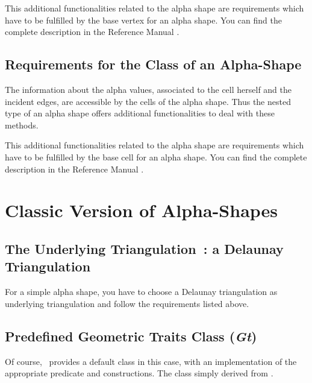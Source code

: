 This additional functionalities related to the alpha shape
are requirements which have to be fulfilled by the base vertex for an alpha
shape. You can find the complete description in the Reference Manual
.  

\subsection{Requirements for the \protect {} Class of an Alpha-Shape}

The information about the alpha values, associated to the cell herself and the
incident edges, are accessible by the 
cells of the alpha shape. Thus the nested 
type of an alpha shape offers additional functionalities to deal with these
methods.

This additional functionalities related to the alpha shape are requirements
which have to be fulfilled by the base cell  for an alpha shape. You can find
the complete description in the Reference Manual
.


\section{Classic Version of Alpha-Shapes\label{I1_SectClassicAS3D}}

\subsection*{The Underlying Triangulation~: a Delaunay Triangulation}

For a simple alpha shape, you have to choose a Delaunay triangulation as
underlying triangulation  and follow the requirements listed above.


\subsection*{Predefined Geometric Traits Class (\mbox{\it Gt})}

Of course, \cgal\ provides a default  class in this
case, with an implementation of the appropriate predicate and constructions.
The class  simply derived from 
.

